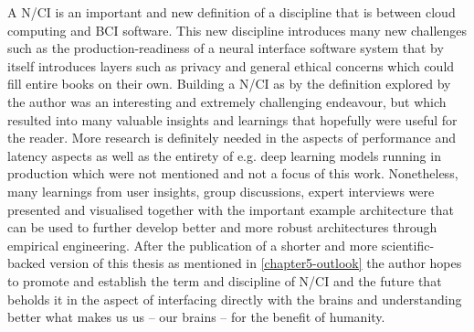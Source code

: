 A N/CI is an important and new definition of a discipline that is between cloud computing and BCI software. This new discipline introduces many new challenges such as the production-readiness of a neural interface software system that by itself introduces layers such as privacy and general ethical concerns which could fill entire books on their own. Building a N/CI as by the definition explored by the author was an interesting and extremely challenging endeavour, but which resulted into many valuable insights and learnings that hopefully were useful for the reader. More research is definitely needed in the aspects of performance and latency aspects as well as the entirety of e.g. deep learning models running in production which were not mentioned and not a focus of this work. Nonetheless, many learnings from user insights, group discussions, expert interviews were presented and visualised together with the important example architecture that can be used to further develop better and more robust architectures through empirical engineering. After the publication of a shorter and more scientific-backed version of this thesis as mentioned in \autoref{chapter5-outlook} the author hopes to promote and establish the term and discipline of N/CI and the future that beholds it in the aspect of interfacing directly with the brains and understanding better what makes us us – our brains – for the benefit of humanity.

